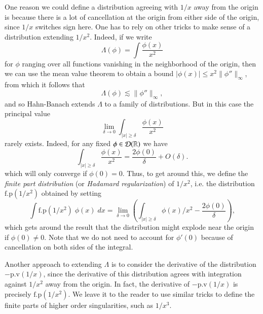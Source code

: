 \begin{example}
    One reason we could define a distribution agreeing with $1/x$ away from the origin is because there is a lot of cancellation at the origin from either side of the origin, since $1/x$ switches sign here. One has to rely on other tricks to make sense of a distribution extending $1/x^2$. Indeed, if we write
    \[ \Lambda(\phi) = \int \frac{\phi(x)}{x^2} \]
    for $\phi$ ranging over all functions vanishing in the neighborhood of the origin, then we can use the mean value theorem to obtain a bound $|\phi(x)| \leq x^2 \| \phi'' \|_\infty$, from which it follows that
    \[ \Lambda(\phi) \lesssim \| \phi'' \|_\infty, \]
    and so Hahn-Banach extends $\Lambda$ to a family of distributions. But in this case the principal value
    \[ \lim_{\delta \to 0} \int_{|x| \geq \delta} \frac{\phi(x)}{x^2} \]
    rarely exists. Indeed, for any fixed $\phi \in \operatorname{\mathcal{D}}(\operatorname{\mathbb{R}})$ we have
    \[ \int_{|x| \geq \delta} \frac{\phi(x)}{x^2} = \frac{2 \phi(0)}{\delta} + O(\delta). \]
    which will only converge if $\phi(0) = 0$. Thus, to get around this, we define the \emph{finite part distribution} (or \emph{Hadamard regularization}) of $1/x^2$, i.e. the distribution $\text{f.p}(1/x^2)$ obtained by setting
    \[ \int \text{f.p}(1/x^2)\; \phi(x)\; dx = \lim_{\delta \to 0} \left( \int_{|x| \geq \delta} \phi(x)/x^2 - \frac{2 \phi(0)}{\delta} \right), \]
    which gets around the result that the distribution might explode near the origin if $\phi(0) \neq 0$. Note that we do not need to account for $\phi'(0)$ because of cancellation on both sides of the integral.

    Another approach to extending $\Lambda$ is to consider the derivative of the distribution $- \text{p.v}(1/x)$, since the derivative of this distribution agrees with integration against $1/x^2$ away from the origin. In fact, the derivative of $- \text{p.v}(1/x)$ is precisely $\text{f.p}(1/x^2)$. We leave it to the reader to use similar tricks to define the finite parts of higher order singularities, such as $1/x^3$.
\end{example}

